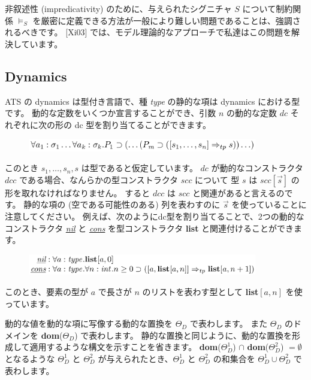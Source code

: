\documentclass[submit,techreq,noauthor,onecolumn]{ipsj}
\begin{document}
非叙述性 (impredicativity) のために、与えられたシグニチャ $S$ について制約関係 $\models_S$ を厳密に定義できる方法が一般により難しい問題であることは、強調されるべきです。
[Xi03] では、モデル理論的なアプローチで私達はこの問題を解決しています。


\subsection{Dynamics}

ATS の dynamics は型付き言語で、種 {\it type} の静的な項は dynamics における型です。
動的な定数をいくつか宣言することができ、引数 $n$ の動的な定数 $dc$ それぞれに次の形の dc 型を割り当てることができます。

\begin{figure}[h]
\centering
\includegraphics[width=10cm]{img/infig22_dc-type.png}
\end{figure}

\noindent このとき $s_1,\ldots,s_n,s$ は型であると仮定しています。
$dc$ が動的なコンストラクタ $dcc$ である場合、なんらかの型コンストラクタ $scc$ について 型 $s$ は $scc[\vec{s}]$ の形を取れなければなりません。
すると $dcc$ は $scc$ と関連があると言えるのです。
静的な項の (空である可能性のある) 列を表わすのに $\vec{s}$ を使っていることに注意してください。
例えば、次のようにdc型を割り当てることで、2つの動的なコンストラクタ {\it \underline{nil}} と {\it \underline{cons}} を型コンストラクタ {\bf list} と関連付けることができます。

\begin{figure}[h]
\centering
\includegraphics[width=10cm]{img/infig22_nil_cons.png}
\end{figure}

\noindent このとき、要素の型が $a$ で長さが $n$ のリストを表わす型として {\bf list}$[a,n]$ を使っています。

動的な値を動的な項に写像する動的な置換を $\Theta_D$ で表わします。
また $\Theta_D$ のドメインを {\bf dom}($\Theta_D$) で表わします。
静的な置換と同じように、動的な置換を形成して適用するような構文を示すことを省きます。
{\bf dom}($\Theta^1_D$) $\cap$ {\bf dom}($\Theta^2_D$) $= \emptyset$ となるような $\Theta^1_D$ と $\Theta^2_D$ が与えられたとき、$\Theta^1_D$ と $\Theta^2_D$ の和集合を $\Theta^1_D \cup \Theta^2_D$ で表わします。
\end{document}
